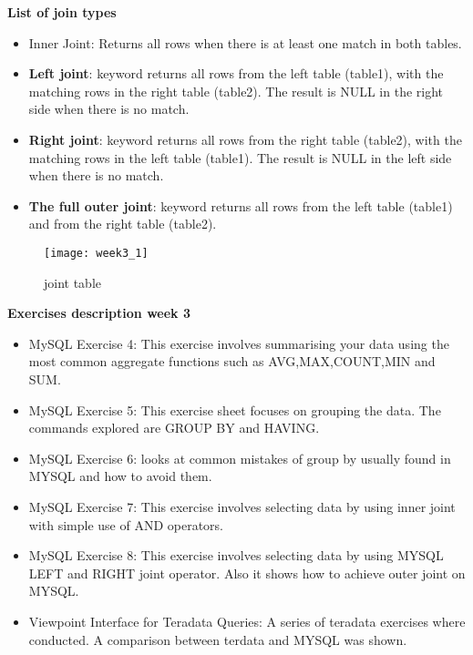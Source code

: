\documentclass{article}
\begin{document}
\noindent \textbf{List of join types }
\begin{itemize}
\item Inner Joint: Returns all rows when there is at least one match in both tables.
\item \textbf{Left joint}: keyword returns all rows from the left table (table1), with the matching rows in the right table (table2). The result is NULL in the right side when there is no match.
\item \textbf{Right joint}: keyword returns all rows from the right table (table2), with the matching rows in the left table (table1). The result is NULL in the left side when there is no match.
\item \textbf{The full outer joint}:  keyword returns all rows from the left table (table1) and from the right table (table2).
\end{itemize}


\begin{figure}[h]

\centering
\texttt{[image: week3\_1]}

\caption{joint table }
\end{figure}

\pagebreak
\noindent \textbf{Exercises description week 3}

\begin{itemize}
\item MySQL Exercise 4: This exercise involves summarising your data using the most common aggregate functions such as AVG,MAX,COUNT,MIN and SUM.

\item  MySQL Exercise 5: This exercise sheet focuses on grouping the data. The commands explored are GROUP BY and HAVING.
\item MySQL Exercise 6: looks at common mistakes of group by usually found in MYSQL and how to avoid them.

\item MySQL Exercise 7: This exercise involves selecting data by using inner joint with simple use of AND operators. 

\item MySQL Exercise 8: This exercise involves selecting data by using MYSQL LEFT and RIGHT joint operator. Also it shows how to achieve outer joint on MYSQL.

\item Viewpoint Interface for Teradata Queries: A series of teradata exercises where conducted. A comparison between terdata and MYSQL was shown. 
\end{itemize}
\end{document}
